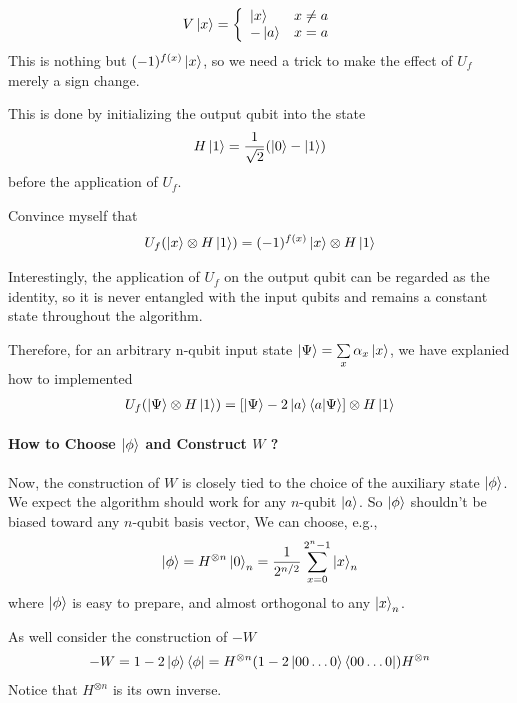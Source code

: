 \begin{align*}
    V\ket{x}=\left\{\begin{array}{ll}
        \ket{x} & x\ne a\\
        -\ket{a} & x=a
    \end{array}\right.
\end{align*}
This is nothing but $(-1)^{f(x)}\ket{x}$, so we need a trick to make the effect of $U_f$ merely a sign change. 

This is done by initializing the output qubit into the state
\begin{align*}
    H\ket{1}=\frac{1}{\sqrt{2}}(\ket{0}-\ket{1})
\end{align*}
before the application of $U_f$. 

Convince myself that
\begin{align*}
    U_f(\ket{x}\otimes H\ket{1})=(-1)^{f(x)}\ket{x}\otimes H\ket{1}
\end{align*}

Interestingly, the application of $U_f$ on the output qubit can be regarded as the identity, so it is never entangled with the input qubits and remains a constant state throughout the algorithm.

Therefore, for an arbitrary n-qubit input state $\ket{\Psi}=\sum\limits_x \alpha_x\ket{x}$, we have explanied how to implemented
\begin{align*}
    U_f(\ket{\Psi}\otimes H\ket{1})=[\ket{\Psi}-2\ket{a}\braket{a|\Psi}]\otimes H\ket{1}
\end{align*}

\paragraph{How to Choose \texorpdfstring{$\ket{\phi}$}. and Construct \texorpdfstring{$W$}. ?}
Now, the construction of $W$ is closely tied to the choice of the auxiliary state $\ket{\phi}$. We expect the algorithm should work for any $n$-qubit $\ket{a}$. So $\ket{\phi}$ shouldn't be biased toward any $n$-qubit basis vector, We can choose, e.g.,
\begin{align*}
    \ket{\phi}=H^{\otimes n}\ket{0}_n=\frac{1}{2^{n/2}}\sum_{x=0}^{2^n-1}\ket{x}_n
\end{align*}
where $\ket{\phi}$ is easy to prepare, and almost orthogonal to any $\ket{x}_n$. 

As well consider the construction of $-W$
\begin{align*}
    -W=1-2\ket{\phi}\bra{\phi}=H^{\otimes n}(1-2\ket{00\dots0}\bra{00\dots0})H^{\otimes n}
\end{align*}
Notice that $H^{\otimes n}$ is its own inverse. 

